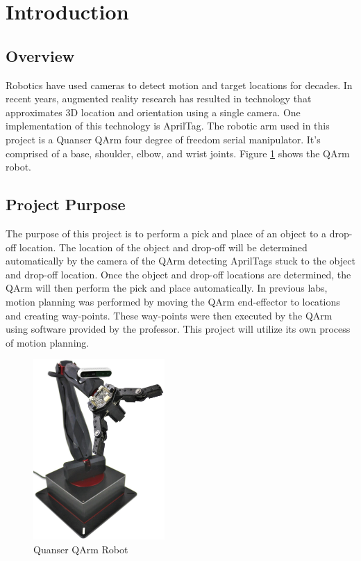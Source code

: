 \section{Introduction} 

\subsection{Overview}
Robotics have used cameras to detect motion and target locations for decades. In recent years, augmented reality research has resulted in technology that approximates 3D location and orientation using a single camera. One implementation of this technology is AprilTag. 
The robotic arm used in this project is a Quanser QArm four degree of freedom serial manipulator. It's comprised of a base, shoulder, elbow, and wrist joints. Figure \ref{fig:QArmPic} shows the QArm robot. 

\subsection{Project Purpose}
The purpose of this project is to perform a pick and place of an object to a drop-off location. The location of the object and drop-off will be determined automatically by the camera of the QArm detecting AprilTags stuck to the object and drop-off location. Once the object and drop-off locations are determined, the QArm will then perform the pick and place automatically. In previous labs, motion planning was performed by moving the QArm end-effector to locations and creating way-points. These way-points were then executed by the QArm using software provided by the professor. This project will utilize its own process of motion planning. 

\begin{figure}[htb]
\centering
\includegraphics[width=5cm]{Figures/QARM Robot.jpeg}
\caption{Quanser QArm Robot}
\label{fig:QArmPic}
\centering
\end{figure}

